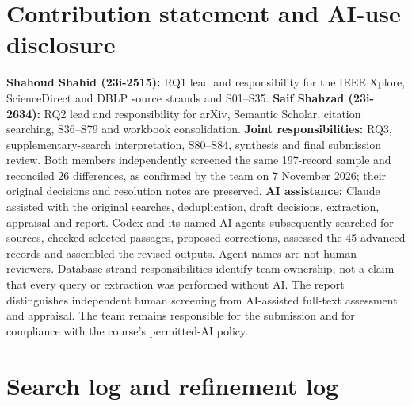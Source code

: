 \section{Contribution statement and AI-use disclosure}\label{sec:contrib}
\textbf{Shahoud Shahid (23i-2515):} RQ1 lead and responsibility for the IEEE Xplore, ScienceDirect and DBLP source strands and S01--S35. \textbf{Saif Shahzad (23i-2634):} RQ2 lead and responsibility for arXiv, Semantic Scholar, citation searching, S36--S79 and workbook consolidation. \textbf{Joint responsibilities:} RQ3, supplementary-search interpretation, S80--S84, synthesis and final submission review. Both members independently screened the same 197-record sample and reconciled 26 differences, as confirmed by the team on 7 November 2026; their original decisions and resolution notes are preserved.
\textbf{AI assistance:} Claude assisted with the original searches, deduplication, draft decisions, extraction, appraisal and report. Codex and its named AI agents subsequently searched for sources, checked selected passages, proposed corrections, assessed the 45 advanced records and assembled the revised outputs. Agent names are not human reviewers. Database-strand responsibilities identify team ownership, not a claim that every query or extraction was performed without AI. The report distinguishes independent human screening from AI-assisted full-text assessment and appraisal. The team remains responsible for the submission and for compliance with the course's permitted-AI policy.

{\small


}

\clearpage
\appendix
{}
\renewcommand{\thetable}{\Alph{section}.\arabic{table}}
\section{Search log and refinement log}
{\footnotesize\setlength{\tabcolsep}{2pt}}
{\footnotesize\setlength{\tabcolsep}{2pt}}
\begin{table}[H]
\centering\footnotesize
\caption{Search validation against known benchmark papers (\checkmarkx{} = retrieved).}\label{tab:validation}

\end{table}
\begin{table}[H]
\centering\footnotesize
\caption{Supplementary search validation against RQ3 benchmark papers (\checkmarkx{} = retrieved).}\label{tab:suppval}

\end{table}

